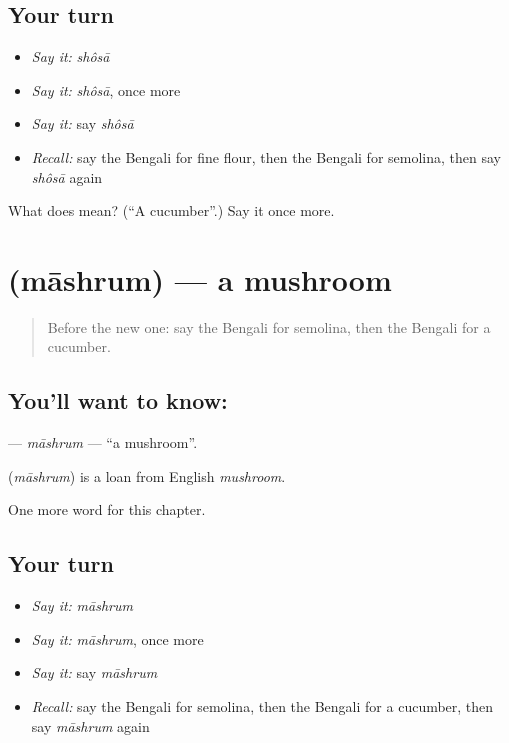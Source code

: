 \subsection*{Your turn}
\begin{itemize}
\raggedright
  \item \emph{Say it:} \emph{shôsā}
  \item \emph{Say it:} \emph{shôsā}, once more
  \item \emph{Say it:} say \emph{shôsā}
  \item \emph{Recall:} say the Bengali for fine flour, then the Bengali for semolina, then say \emph{shôsā} again
\end{itemize}

\begin{tcolorbox}[breakable,colback=teal!4,colframe=teal!35!black,title={Before you move on}]
What does  mean? (\textquotedblleft{}A cucumber\textquotedblright{}.) Say it once more.
\end{tcolorbox}
\section[\texorpdfstring{\bn{মাশরুম} (māshrum)}{মাশরুম (māshrum)}]{ (māshrum) — a mushroom}

\label{lesson:BN-C232-mashrum}



\begin{quote}
Before the new one: say the Bengali for semolina, then the Bengali for a cucumber.
\end{quote}

\subsection*{You'll want to know: }
\textbf{} — \emph{māshrum} — \textquotedblleft{}a mushroom\textquotedblright{}.

\begin{cousinweb}
\textbf{} (\emph{māshrum}) is a loan from English \emph{mushroom}.
\end{cousinweb}

\begin{grammarlens}[title={What you've built}]
One more word for this chapter.
\end{grammarlens}

\subsection*{Your turn}
\begin{itemize}
\raggedright
  \item \emph{Say it:} \emph{māshrum}
  \item \emph{Say it:} \emph{māshrum}, once more
  \item \emph{Say it:} say \emph{māshrum}
  \item \emph{Recall:} say the Bengali for semolina, then the Bengali for a cucumber, then say \emph{māshrum} again
\end{itemize}

